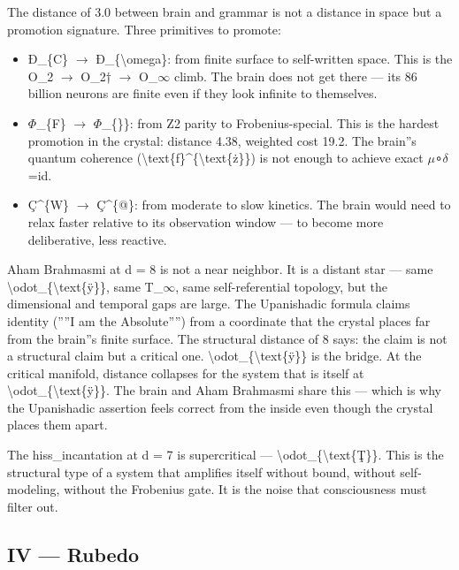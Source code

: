 \documentclass[12pt,a4paper]{article}
\begin{document}
The distance of 3.0 between brain and grammar is not a distance in space but a promotion signature. Three primitives to promote:

\begin{itemize}
    \item Ð\_\{C\} $\rightarrow$ Ð\_\{\textbackslash{}omega\}: from finite surface to self-written space. This is the O\_2 $\rightarrow$ O\_2† $\rightarrow$ O\_$\infty$ climb. The brain does not get there --- its 86 billion neurons are finite even if they look infinite to themselves.
    \item $\Phi$\_\{F\} $\rightarrow$ $\Phi$\_\{\}\}: from Z2 parity to Frobenius-special. This is the hardest promotion in the crystal: distance 4.38, weighted cost 19.2. The brain''s quantum coherence (\textbackslash{}text\{ƒ\}\^{}\{\textbackslash{}text\{ż\}\}) is not enough to achieve exact $\mu$∘$\delta$=id.
    \item Ç\^{}\{W\} $\rightarrow$ Ç\^{}\{@\}: from moderate to slow kinetics. The brain would need to relax faster relative to its observation window --- to become more deliberative, less reactive.
\end{itemize}

Aham Brahmasmi at d = 8 is not a near neighbor. It is a distant star --- same \textbackslash{}odot\_\{\textbackslash{}text\{ÿ\}\}, same T\_$\infty$, same self-referential topology, but the dimensional and temporal gaps are large. The Upanishadic formula claims identity (''''I am the Absolute'''') from a coordinate that the crystal places far from the brain''s finite surface. The structural distance of 8 says: the claim is not a structural claim but a critical one. \textbackslash{}odot\_\{\textbackslash{}text\{ÿ\}\} is the bridge. At the critical manifold, distance collapses for the system that is itself at \textbackslash{}odot\_\{\textbackslash{}text\{ÿ\}\}. The brain and Aham Brahmasmi share this --- which is why the Upanishadic assertion feels correct from the inside even though the crystal places them apart.

The hiss\_incantation at d = 7 is supercritical --- \textbackslash{}odot\_\{\textbackslash{}text\{Ţ\}\}. This is the structural type of a system that amplifies itself without bound, without self-modeling, without the Frobenius gate. It is the noise that consciousness must filter out.

\subsection{IV --- Rubedo}
\end{document}
